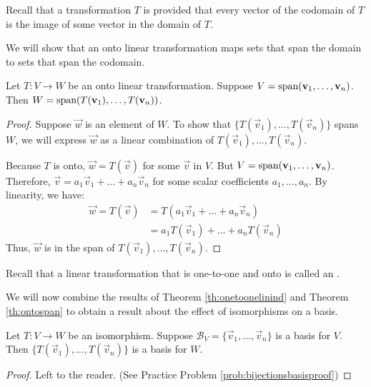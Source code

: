 \documentclass{ximera}
\begin{document}
Recall that a transformation $T$ is  provided that every vector of the codomain of $T$ is the image of some vector in the domain of $T$.  

We will show that an onto linear transformation maps sets that span the domain to sets that span the codomain. 

\begin{theorem}\label{th:ontospan}
Let $T:V\rightarrow W$ be an onto linear transformation.  Suppose $V=\textnormal{span}(\vec{v}_1,\ldots ,\vec{v}_n)$.  Then $W=\textnormal{span}(T(\vec{v}_1),\ldots ,T(\vec{v}_n))$.
\end{theorem}
\begin{proof}
Suppose $\vec{w}$ is an element of $W$. To show that $\{T(\vec{v}_1),\ldots ,T(\vec{v}_n)\}$ spans $W$, we will express $\vec{w}$ as a linear combination of $T(\vec{v}_1),\ldots ,T(\vec{v}_n)$.

Because $T$ is onto, $\vec{w}=T(\vec{v})$ for some $\vec{v}$ in $V$.  But $V=\textnormal{span}(\vec{v}_1,\ldots ,\vec{v}_n)$.  Therefore, $\vec{v}=a_1\vec{v}_1+\ldots +a_n\vec{v}_n$ for some scalar coefficients $a_1,\ldots ,a_n$.
By linearity, we have:
\begin{align*}
\vec{w}=T(\vec{v})&=T(a_1\vec{v}_1+\ldots +a_n\vec{v}_n)\\
&=a_1T(\vec{v}_1)+\ldots +a_nT(\vec{v}_n)
\end{align*}
Thus, $\vec{w}$ is in the span of $T(\vec{v}_1),\ldots ,T(\vec{v}_n)$.
\end{proof}
 
Recall that a linear transformation that is one-to-one and onto is called an .

We will now combine the results of Theorem \ref{th:onetoonelinind} and Theorem \ref{th:ontospan} to obtain a result about the effect of isomorphisms on a basis.

\begin{theorem}\label{th:bijectionsbasis}
Let $T:V\rightarrow W$ be an isomorphism.  Suppose $\mathcal{B}_V=\{\vec{v}_1,\ldots ,\vec{v}_n\}$ is a basis for $V$.  Then $\{T(\vec{v}_1),\ldots ,T(\vec{v}_n)\}$ is a basis for $W$.
\end{theorem}
\begin{proof}
Left to the reader.  (See Practice Problem \ref{prob:bijectionsbasisproof}) 
\end{proof}
 
 
\end{document}
